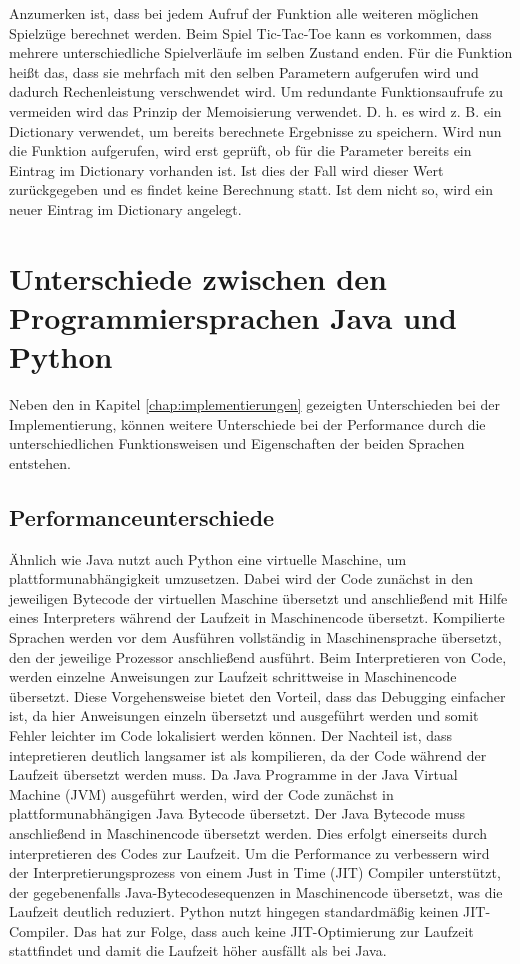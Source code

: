 Anzumerken ist, dass bei jedem Aufruf der Funktion  alle weiteren möglichen Spielzüge berechnet werden. 
Beim Spiel Tic-Tac-Toe kann es vorkommen, dass mehrere unterschiedliche Spielverläufe im selben Zustand enden. 
Für die Funktion  heißt das, dass sie mehrfach mit den selben Parametern aufgerufen wird und dadurch 
Rechenleistung verschwendet wird. Um redundante Funktionsaufrufe zu vermeiden wird das Prinzip der Memoisierung 
verwendet. D. h. es wird z. B. ein Dictionary verwendet, um bereits berechnete Ergebnisse zu speichern. Wird nun 
die Funktion  aufgerufen, wird erst geprüft, ob für die Parameter bereits ein Eintrag im Dictionary 
vorhanden ist. Ist dies der Fall wird dieser Wert zurückgegeben und es findet keine Berechnung statt. Ist dem nicht 
so, wird ein neuer Eintrag im Dictionary angelegt.

\section{Unterschiede zwischen den Programmiersprachen Java und Python}
\label{chap:unterschiede_python_java}
Neben den in Kapitel \ref{chap:implementierungen} gezeigten Unterschieden bei der Implementierung, können weitere Unterschiede 
bei der Performance durch die unterschiedlichen Funktionsweisen und Eigenschaften der beiden Sprachen entstehen.

\subsection{Performanceunterschiede}
Ähnlich wie Java nutzt auch Python eine virtuelle Maschine, um plattformunabhängigkeit umzusetzen. Dabei wird der Code 
zunächst in den jeweiligen Bytecode der virtuellen Maschine übersetzt und anschließend mit Hilfe eines Interpreters während 
der Laufzeit in Maschinencode übersetzt. Kompilierte Sprachen werden vor dem Ausführen vollständig in Maschinensprache übersetzt, den der 
jeweilige Prozessor anschließend ausführt. Beim Interpretieren von Code, werden einzelne Anweisungen zur Laufzeit schrittweise 
in Maschinencode übersetzt. Diese Vorgehensweise bietet den Vorteil, dass das Debugging einfacher ist, da hier Anweisungen 
einzeln übersetzt und ausgeführt werden und somit Fehler leichter im Code lokalisiert werden können. Der Nachteil ist, dass 
intepretieren deutlich langsamer ist als kompilieren, da der Code während der Laufzeit übersetzt werden muss. Da Java Programme 
in der Java Virtual Machine (JVM) ausgeführt werden, wird der Code zunächst in plattformunabhängigen Java Bytecode übersetzt. 
Der Java Bytecode muss anschließend in Maschinencode übersetzt werden. Dies erfolgt einerseits durch interpretieren des Codes 
zur Laufzeit. Um die Performance zu verbessern wird der Interpretierungsprozess von einem Just in Time (JIT) Compiler unterstützt, 
der gegebenenfalls Java-Bytecodesequenzen in Maschinencode übersetzt, was die Laufzeit deutlich reduziert.\autocite[Vgl.][]{Aboullaite.31.8.2017}
Python nutzt hingegen standardmäßig keinen JIT-Compiler. Das hat zur Folge, dass auch keine JIT-Optimierung zur Laufzeit stattfindet 
und damit die Laufzeit höher ausfällt als bei Java.\autocite[Vgl.][]{Shaw.16.7.2018}

